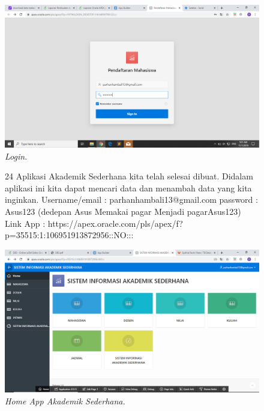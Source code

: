 \begin{enumerate}
\begin{figure}
    \begin{center}
    \includegraphics[scale=0.3]{figures/32.png}
    \caption{\textit{Login.}}
    \end{center}
    \label{gambar}
    \end{figure}   

\begin{figure}
\item[24]Aplikasi Akademik Sederhana kita telah selesai dibuat. Didalam aplikasi ini kita dapat mencari data dan menambah data yang kita inginkan.
Username/email : parhanhambali13@gmail.com
password : Asus123 (dedepan Asus Memakai pagar Menjadi pagarAsus123)
Link App : https://apex.oracle.com/pls/apex/f?p=35515:1:106951913872956::NO:::

    \begin{center}
    \includegraphics[scale=0.3]{figures/29.png}
    \caption{\textit{Home App Akademik Sederhana.}}
    \end{center}
    \label{gambar}
    \end{figure}   

\end{enumerate}
